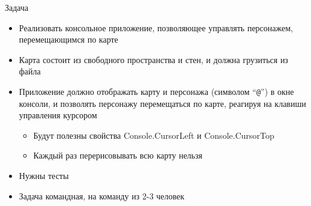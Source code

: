 \documentclass{../../slides-style}
\begin{document}
    \begin{frame}[plain]
        \titlepage
    \end{frame}

    \begin{frame}{Задача}
        \begin{itemize}
            \item Реализовать консольное приложение, позволяющее управлять персонажем, перемещающимся по карте
            \item Карта состоит из свободного пространства и стен, и должна грузиться из файла
            \item Приложение должно отображать карту и персонажа (символом \enquote{\texttt{@}}) в окне консоли, и позволять персонажу перемещаться по карте, реагируя на клавиши управления курсором
            \begin{itemize}
                \item Будут полезны свойства Console.CursorLeft и Console.CursorTop 
                \item Каждый раз перерисовывать всю карту нельзя
            \end{itemize}
            \item Нужны тесты
            \item Задача командная, на команду из 2-3 человек
        \end{itemize}
    \end{frame}
\end{document}
